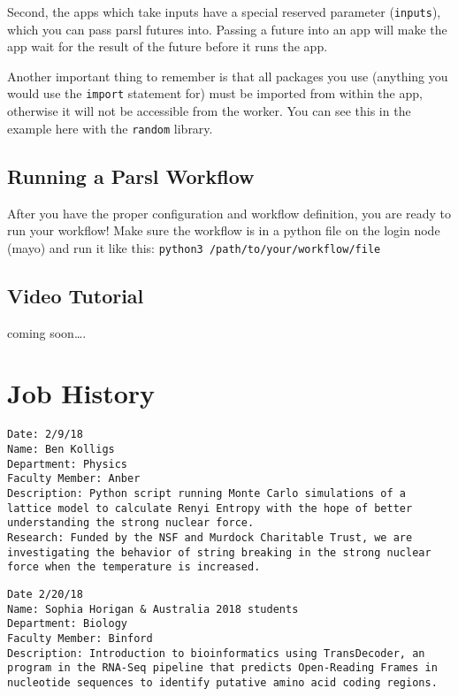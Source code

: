 \documentclass[]{book}
\theoremstyle{definition}
\theoremstyle{definition}
\theoremstyle{definition}
\theoremstyle{remark}
\begin{document}
Second, the apps which take inputs have a special reserved parameter
(\texttt{inputs}), which you can pass parsl futures into. Passing a
future into an app will make the app wait for the result of the future
before it runs the app.

Another important thing to remember is that all packages you use
(anything you would use the \texttt{import} statement for) must be
imported from within the app, otherwise it will not be accessible from
the worker. You can see this in the example here with the
\texttt{random} library.

\section{Running a Parsl Workflow}\label{running-a-parsl-workflow}

After you have the proper configuration and workflow definition, you are
ready to run your workflow! Make sure the workflow is in a python file
on the login node (mayo) and run it like this:
\texttt{python3\ /path/to/your/workflow/file}

\section{Video Tutorial}\label{video-tutorial}

coming soon\ldots{}.

\appendix


\chapter{Job History}\label{job-history}

\begin{verbatim}
Date: 2/9/18
Name: Ben Kolligs
Department: Physics
Faculty Member: Anber
Description: Python script running Monte Carlo simulations of a lattice model to calculate Renyi Entropy with the hope of better understanding the strong nuclear force.
Research: Funded by the NSF and Murdock Charitable Trust, we are investigating the behavior of string breaking in the strong nuclear force when the temperature is increased.
\end{verbatim}

\begin{verbatim}
Date 2/20/18
Name: Sophia Horigan & Australia 2018 students
Department: Biology
Faculty Member: Binford
Description: Introduction to bioinformatics using TransDecoder, an program in the RNA-Seq pipeline that predicts Open-Reading Frames in nucleotide sequences to identify putative amino acid coding regions.
\end{verbatim}
\end{document}
